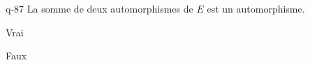 \begin{truefalse}{q-87}
La somme de deux automorphismes de $E$ est un automorphisme.
\item Vrai
\item* Faux
\end{truefalse}

